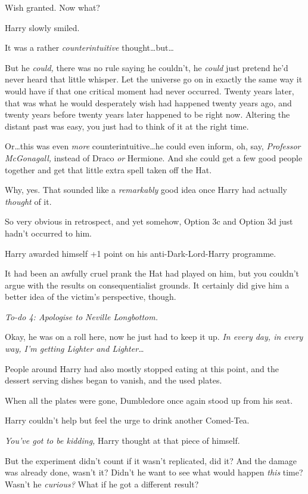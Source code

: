 Wish granted. Now what?

Harry slowly smiled.

It was a rather \emph{counterintuitive} thought…but…

But he \emph{could,} there was no rule saying he couldn’t, he \emph{could} just pretend he’d never heard that little whisper. Let the universe go on in exactly the same way it would have if that one critical moment had never occurred. Twenty years later, that was what he would desperately wish had happened twenty years ago, and twenty years before twenty years later happened to be right now. Altering the distant past was easy, you just had to think of it at the right time.

Or…this was even \emph{more} counterintuitive…he could even inform, oh, say, \emph{Professor McGonagall,} instead of Draco \emph{or} Hermione. And she could get a few good people together and get that little extra spell taken off the Hat.

Why, yes. That sounded like a \emph{remarkably} good idea once Harry had actually \emph{thought} of it.

So very obvious in retrospect, and yet somehow, Option 3c and Option 3d just hadn’t occurred to him.

Harry awarded himself +1 point on his anti-Dark-Lord-Harry programme.

It had been an awfully cruel prank the Hat had played on him, but you couldn’t argue with the results on consequentialist grounds. It certainly did give him a better idea of the victim’s perspective, though.

\emph{To-do 4: Apologise to Neville Longbottom.}

Okay, he was on a roll here, now he just had to keep it up. \emph{In every day, in every way, I’m getting Lighter and Lighter…}

People around Harry had also mostly stopped eating at this point, and the dessert serving dishes began to vanish, and the used plates.

When all the plates were gone, Dumbledore once again stood up from his seat.

Harry couldn’t help but feel the urge to drink another Comed-Tea.

\emph{You’ve \emph{got} to be kidding,} Harry thought at that piece of himself.

But the experiment didn’t count if it wasn’t replicated, did it? And the damage was already done, wasn’t it? Didn’t he want to see what would happen \emph{this} time? Wasn’t he \emph{curious?} What if he got a different result?

